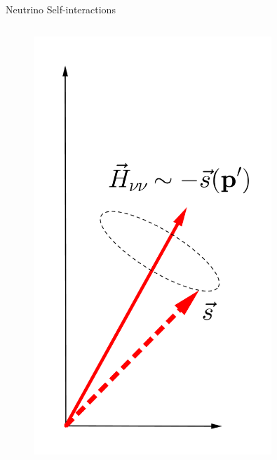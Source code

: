 \begin{frame}{Neutrino Self-interactions}
\begin{columns}[T]
\begin{column}{0.5\textwidth}
      \begin{figure}
         \includegraphics[width=0.8\textwidth]{assets/self-interaction}
      \end{figure}




   \end{column}


\end{columns}





\end{frame}


